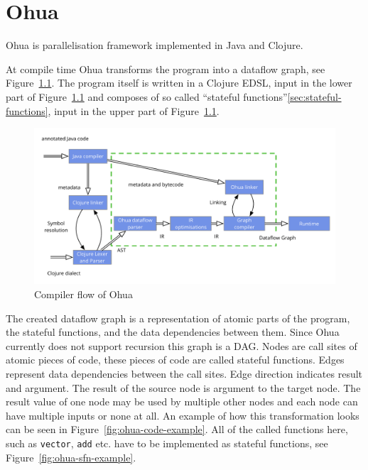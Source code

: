 \chapter{Ohua}

\label{ch:Ohua}

Ohua\cite{Ertel:2015:OID:2807426.2807431}\cite{Ohua:library:link} is parallelisation framework implemented in Java\cite{JavaLanguage} and Clojure\cite{ClojureLanguage}.

At compile time Ohua transforms the program into a dataflow graph, see Figure~\ref{fig:ohua-compiler-flow}.
The program itself is written in a Clojure EDSL, input in the lower part of Figure~\ref{fig:ohua-compiler-flow} and composes of so called ``stateful functions''\ref{sec:stateful-functions}, input in the upper part of Figure~\ref{fig:ohua-compiler-flow}.

\begin{figure}
  \includegraphics[width=\textwidth]{../Figures/ohua-compiler-flow}
  \caption{Compiler flow of Ohua}
  \label{fig:ohua-compiler-flow}
\end{figure}


The created dataflow graph is a representation of atomic parts of the program, the stateful functions, and the data dependencies between them.
Since Ohua currently does not support recursion this graph is a DAG.
Nodes are call sites of atomic pieces of code, these pieces of code are called stateful functions.
Edges represent data dependencies between the call sites.
Edge direction indicates result and argument.
The result of the source node is argument to the target node.
The result value of one node may be used by multiple other nodes and each node can have multiple inputs or none at all.
An example of how this transformation looks can be seen in Figure~\ref{fig:ohua-code-example}.
All of the called functions here, such as \texttt{vector}, \texttt{add} etc. have to be implemented as stateful functions, see Figure~\ref{fig:ohua-sfn-example}.

